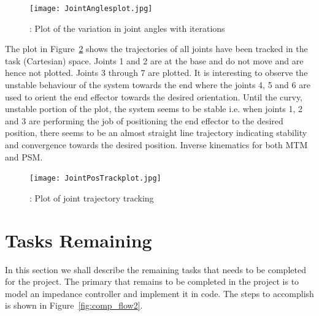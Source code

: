 \documentclass[10pt,journal,compsoc]{IEEEtran}
\begin{document}
\begin{figure}[htbp]
\begin{center}
\texttt{[image: JointAnglesplot.jpg]}
\caption{: Plot of the variation in joint angles with iterations}
\label{fig:JointAnglesplot}
\end{center}
\end{figure}

The plot in Figure~\ref{fig:JointPosTrackplot} shows the trajectories of all joints have been tracked in the task (Cartesian) space. Joints 1 and 2 are at the base and do not move and are hence not plotted. Joints 3 through 7 are plotted. It is interesting to observe the unstable behaviour of the system towards the end where the joints 4, 5 and 6 are used to orient the end effector towards the desired orientation. Until the curvy, unstable portion of the plot, the system seems to be stable i.e. when joints 1, 2 and 3 are performing the job of positioning the end effector to the desired position, there seems to be an almost straight line trajectory indicating stability and convergence towards the desired position.
Inverse kinematics for both MTM and PSM.

\begin{figure}[htbp]
\begin{center}
\texttt{[image: JointPosTrackplot.jpg]}
\caption{: Plot of joint trajectory tracking}
\label{fig:JointPosTrackplot}
\end{center}
\end{figure}

\section{Tasks Remaining}
In this section we shall describe the remaining tasks that needs to be completed for the project. The primary that remains to be completed in the project is to model an impedance controller and implement it in code. The steps to accomplish is shown in Figure~\ref{fig:comp_flow2}.
\end{document}
